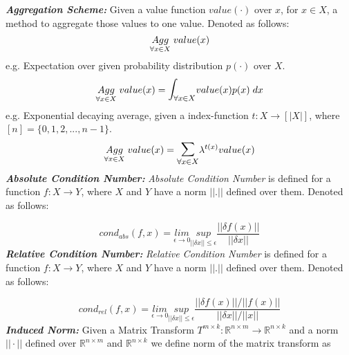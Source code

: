 \textbf{\textit{Aggregation Scheme:}} Given a value function $value(\cdot)$ over $x$, for $x \in X$, a method to aggregate those values to one value. Denoted as follows:
\begin{equation}
\underset{\forall x\in X}{Agg}\hspace{1mm} value(x)
\end{equation}
e.g. Expectation over given probability distribution $p(\cdot)$ over $X$.
\begin{equation}
\underset{\forall x\in X}{Agg}\hspace{1mm} value(x) = \mathlarger{\mathlarger{\int}}_{\forall x\in X} value(x)p(x)\hspace{1mm}dx
\end{equation}
e.g. Exponential decaying average, given a index-function $t:X\to[|X|]$, where $[n] = \{0,1,2,...,n-1\}$.
\begin{equation}
\underset{\forall x\in X}{Agg}\hspace{1mm} value(x) = \mathlarger{\mathlarger{\sum}}_{\forall x\in X} \lambda^{t(x)}value(x)
\end{equation}
\newline
\textbf{\textit{Absolute Condition Number:}} \textit{Absolute Condition Number} is defined for a function $f: X \to Y$, where $X$ and $Y$ have a norm $||.||$ defined over them. Denoted as follows:

\begin{equation} \label{def_cond_abs}
cond_{abs}(f,x) = \underset{\epsilon \to 0}{lim}\underset{||\delta x||\le \epsilon}{sup} \frac{||\delta f(x)||}{||\delta x||}
\end{equation}
\newline
\textbf{\textit{Relative Condition Number:}} \textit{Relative Condition Number} is defined for a function $f: X \to Y$, where $X$ and $Y$ have a norm $||.||$ defined over them. Denoted as follows:

\begin{equation} \label{def_cond_rel}
cond_{rel}(f,x) = \underset{\epsilon \to 0}{lim}\underset{||\delta x||\le \epsilon}{sup} \frac{||\delta f(x)||/||f(x)||}{||\delta x||/||x||}
\end{equation}
\newline
\textbf{\textit{Induced Norm:}} Given a Matrix Transform $T^{m\times k}: \mathbb{R}^{n\times m} \to \mathbb{R}^{n\times k}$ and a norm $||\cdot||$ defined over $\mathbb{R}^{n\times m}$ and $\mathbb{R}^{n\times k}$ we define norm of the matrix transform as 

